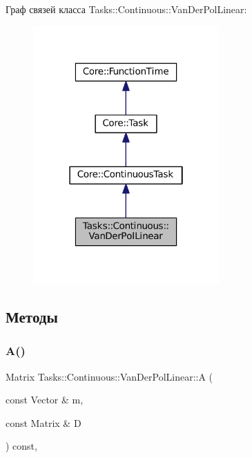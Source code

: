 Граф связей класса Tasks\+:\+:Continuous\+:\+:Van\+Der\+Pol\+Linear\+:\nopagebreak
\begin{figure}[H]
\begin{center}
\leavevmode
\includegraphics[width=202pt]{class_tasks_1_1_continuous_1_1_van_der_pol_linear__coll__graph}
\end{center}
\end{figure}


\subsection{Методы}
\hypertarget{class_tasks_1_1_continuous_1_1_van_der_pol_linear_a2eefb5fca01c3517c44d2683032fda9d}{}\label{class_tasks_1_1_continuous_1_1_van_der_pol_linear_a2eefb5fca01c3517c44d2683032fda9d} 
\subsubsection{\texorpdfstring{A()}{A()}}
{\footnotesize\ttfamily Matrix Tasks\+::\+Continuous\+::\+Van\+Der\+Pol\+Linear\+::A (\begin{DoxyParamCaption}\item[{const Vector \&}]{m,  }\item[{const Matrix \&}]{D }\end{DoxyParamCaption}) const\hspace{0.3cm}{\ttfamily [override]}, {\ttfamily [virtual]}}



